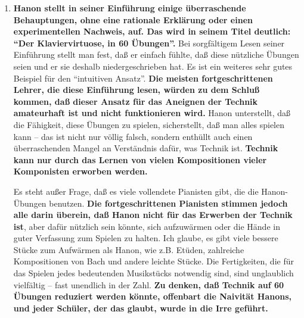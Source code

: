 \begin{enumerate}[label={\roman*.}]  

\item \label{c1iii7h1}\textbf{Hanon stellt in seiner Einführung einige überraschende Behauptungen, ohne eine rationale Erklärung oder einen experimentellen Nachweis, auf.
Das wird in seinem Titel deutlich: \enquote{Der Klaviervirtuose, in 60 Übungen}.}
Bei sorgfältigem Lesen seiner Einführung stellt man fest, daß er einfach fühlte, daß diese nützliche Übungen seien und er sie deshalb niedergeschrieben hat.
Es ist ein weiteres sehr gutes Beispiel für den \enquote{intuitiven Ansatz}.
\textbf{Die meisten fortgeschrittenen Lehrer, die diese Einführung lesen, würden zu dem Schluß kommen, daß dieser Ansatz für das Aneignen der Technik amateurhaft ist und nicht funktionieren wird.}
Hanon unterstellt, daß die Fähigkeit, diese Übungen zu spielen, sicherstellt, daß man alles spielen kann -- das ist nicht nur völlig falsch, sondern enthüllt auch einen überraschenden Mangel an Verständnis dafür, was Technik ist.
\textbf{Technik kann nur durch das Lernen von vielen Kompositionen vieler Komponisten erworben werden.}

Es steht außer Frage, daß es viele vollendete Pianisten gibt, die die Hanon-Übungen benutzen.
\textbf{Die fortgeschrittenen Pianisten stimmen jedoch alle darin überein, daß Hanon nicht für das Erwerben der Technik ist}, aber dafür nützlich sein könnte, sich aufzuwärmen oder die Hände in guter Verfassung zum Spielen zu halten.
Ich glaube, es gibt viele bessere Stücke zum Aufwärmen als Hanon, wie z.B. Etüden, zahlreiche Kompositionen von Bach und andere leichte Stücke.
Die Fertigkeiten, die für das Spielen jedes bedeutenden Musikstücks notwendig sind, sind unglaublich vielfältig -- fast unendlich in der Zahl.
\textbf{Zu denken, daß Technik auf 60 Übungen reduziert werden könnte, offenbart die Naivität Hanons, und jeder Schüler, der das glaubt, wurde in die Irre geführt.}




\end{enumerate}
